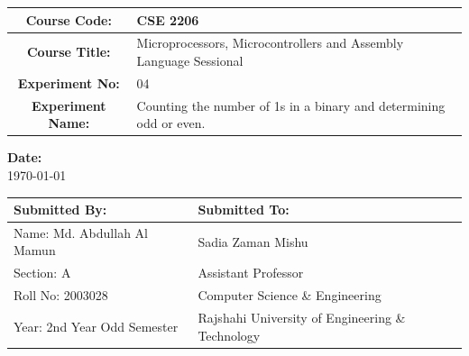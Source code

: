 \documentclass[a4paper,12pt]{report}
\begin{document}
\begin{titlepage}
\begin{center}
        \begin{table}[h]
            \centering
            \begin{tabularx}{0.7\paperwidth}{|c|X|}
                \hline
                \textbf{Course Code:}     & CSE 2206                                                           \\
                \hline
                \textbf{Course Title:}    & Microprocessors, Microcontrollers and Assembly Language Sessional  \\
                \hline
                \textbf{Experiment No:}   & 04                                                                 \\
                \hline
                \textbf{Experiment Name:} & Counting the number of 1s in a binary and determining odd or even. \\
                \hline
            \end{tabularx}%
        \end{table}

        \vspace{0.5in}
        \textbf{Date:} \\
        \today

        \vfill

        \begin{table}[h]
            \centering
            \begin{tabularx}{0.7\paperwidth}{|X|X|}
                \hline
                Submitted By:               & Submitted To:                                    \\
                \hline
                Name: Md. Abdullah Al Mamun & Sadia Zaman Mishu                                \\
                \hline
                Section: A                  & Assistant Professor                              \\
                \hline
                Roll No: 2003028            & Computer Science \& Engineering                  \\
                \hline
                Year: 2nd Year Odd Semester & Rajshahi University of Engineering \& Technology \\
                \hline
            \end{tabularx}
        \end{table}
    \end{center}
\end{titlepage}
\end{document}
